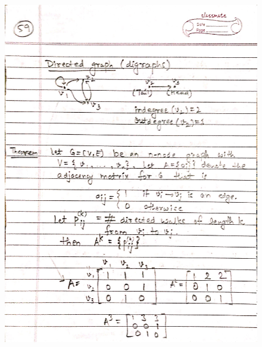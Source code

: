 \begin{figure}[H]
    \centering
    \includegraphics[width=16cm, height=21cm]{"./MIT-6.042J/MIT-6042J-059"}
\end{figure}
\newpage
